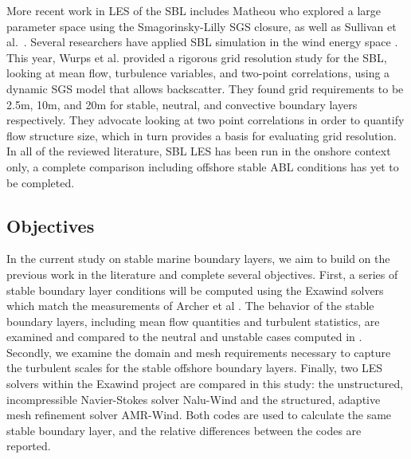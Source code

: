 \documentclass[conf]{new-aiaa}
\begin{document}
More recent work in LES of the SBL includes Matheou \cite{Matheou2016} who 
explored a large parameter space using the Smagorinsky-Lilly SGS 
closure, as well as Sullivan et al.\ \cite{sullivan2016turbulent}. Several researchers 
have applied SBL simulation in the wind energy space \cite{Aitken2014, Abkar2015, Ghaisas2017}. 
This year, Wurps et al. \cite{Wurps2020} provided a rigorous grid resolution study for the SBL, 
looking at mean flow, turbulence variables, and two-point correlations, using a dynamic 
SGS model that allows backscatter. They found grid requirements to be 2.5m, 10m, and 20m 
for stable, neutral, and convective boundary layers respectively. They advocate looking 
at two point correlations in order to quantify flow structure size, which in turn 
provides a basis for evaluating grid resolution. In all of the reviewed literature, SBL LES 
has been run in the onshore context only, a complete comparison
including offshore stable ABL conditions has yet to be completed.



\subsection{Objectives}
In the current study on stable marine boundary layers, we aim to build
on the previous work in the literature and complete several
objectives.  First, a series of stable boundary layer conditions will
be computed using the Exawind solvers which match the measurements of
Archer et al \cite{archer2016predominance}.  The behavior of the
stable boundary layers, including mean flow quantities and turbulent
statistics, are examined and compared to the neutral and unstable
cases computed in \cite{cheung2020large}.  Secondly, we examine the
domain and mesh requirements necessary to capture the turbulent scales
for the stable offshore boundary layers.  Finally, two LES solvers
within the Exawind project are compared in this study: the
unstructured, incompressible Navier-Stokes solver Nalu-Wind and the
structured, adaptive mesh refinement solver AMR-Wind.  Both codes are
used to calculate the same stable boundary layer, and the relative
differences between the codes are reported.




\end{document}
